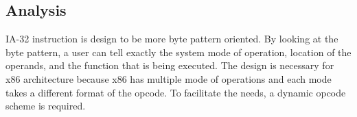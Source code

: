 \documentclass[letterpaper,10pt,titlepage]{article}
\begin{document}
\subsection{Analysis}
IA-32 instruction is design to be more byte pattern oriented. 
By looking at the byte pattern, a user can tell exactly the system mode of operation,
location of the operands, and the function that is being executed. 
The design is necessary for x86 architecture because x86 has multiple mode of operations
and each mode takes a different format of the opcode. To facilitate the needs, a dynamic
opcode scheme is required. 





\newpage
\nocite{*}


\end{document}
